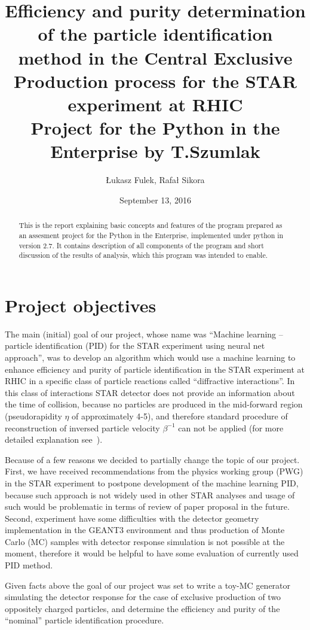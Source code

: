 \documentclass[a4paper,11pt]{article}
\title{Efficiency and purity determination of the particle identification method in the Central Exclusive Production process for the STAR experiment at RHIC\\[12pt]\large Project for the Python in the Enterprise by T.Szumlak\vspace{-10pt}}
\author{Łukasz Fulek, Rafał Sikora\vspace{-10pt}}
\date{September 13, 2016}
\begin{document}
\maketitle

\begin{abstract}
This is the report explaining basic concepts and features of the program prepared as an assesment project for the Python in the Enterprise, implemented under python in version 2.7. It contains description of all components of the program and short discussion of the results of analysis, which this program was intended to enable.
\end{abstract}

\section{Project objectives}

The main (initial) goal of our project, whose name was ``Machine learning – particle identification (PID) for the STAR experiment using neural net approach'', was to develop an algorithm which would use a machine learning to enhance efficiency and purity of particle identification in the STAR experiment at RHIC in a specific class of particle reactions called ``diffractive interactions''. In this class of interactions STAR detector does not provide an information about the time of collision, because no particles are produced in the mid-forward region (pseudorapidity $\eta$ of approximately 4-5), and therefore standard procedure of reconstruction of inversed particle velocity $\beta^{-1}$ can not be applied (for more detailed explanation see~\cite{1}).

Because of a few reasons we decided to partially change the topic of our project. First, we have received recommendations from the physics working group (PWG) in the STAR experiment to postpone development of the machine learning PID, because such approach is not widely used in other STAR analyses and usage of such would be problematic in terms of review of paper proposal in the future.
Second, experiment have some difficulties with the detector geometry implementation in the GEANT3 environment and thus production of Monte Carlo (MC) samples with detector response simulation is not possible at the moment, therefore it would be helpful to have some evaluation of currently used PID method.

Given facts above the goal of our project was set to write a toy-MC generator simulating the detector response for the case of exclusive production of two oppositely charged particles, and determine the efficiency and purity of the ``nominal'' particle identification procedure.
\end{document}
